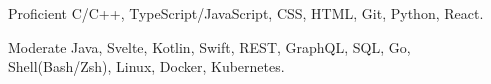

\begin{cvskills}

  \cvskill
    {Proficient} %
    {C/C++, TypeScript/JavaScript, CSS, HTML, Git, Python, React.} %

  \cvskill
    {Moderate} %
    {Java, Svelte, Kotlin, Swift, REST, GraphQL, SQL, Go, Shell(Bash/Zsh), Linux, Docker, Kubernetes.} %

\end{cvskills}
